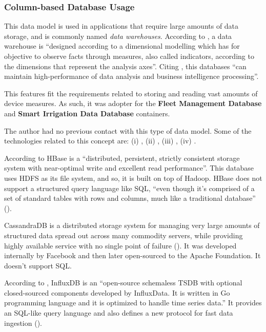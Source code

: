 \subsubsection{Column-based Database Usage}
\label{subsubsec:implementation:decisions:database:time}

This data model is used in applications that require large amounts of data storage, and is commonly named \textit{data warehouses}. According to \cite{dehdouh2015using}, a data warehouse  is ``designed according to a dimensional modelling which has for objective to observe facts through measures, also called indicators, according to the dimensions that represent the analysis axes''. Citing \cite{han2011survey}, this databases ``can maintain high-performance of data analysis and business intelligence processing''.

This features fit the requirements related to storing and reading vast amounts of device measures. As such, it was adopter for the \textbf{Fleet Management Database} and \textbf{Smart Irrigation Data Database} containers.

The author had no previous contact with this type of data model. Some of the technologies related to this concept are: (i) , (ii) , (iii) , (iv) .

According to \cite{george2011hbase} HBase is a ``distributed, persistent, strictly consistent storage system with near-optimal write and excellent read performance''. This database uses \gls{HDFS} as its file system, and so, it is built on top of Hadoop. 
HBase does not support a structured query language like \gls{SQL}, ``even though it's comprised of a set of standard tables with rows and columns, much like a traditional database'' (\cite{ibm-hbase}).

CassandraDB is a distributed storage system for managing very large amounts of structured data spread out across many commodity servers, while providing highly available service with no single point of failure (\cite{lakshman2010cassandra}).
It was developed internally by Facebook and then later open-sourced to the Apache Foundation. It doesn't support \gls{SQL}.

According to \cite{naqvi2017time}, InfluxDB is an ``open-source schemaless \gls{TSDB} with optional closed-sourced components developed by InfluxData. It is written in Go programming language and it is optimized to handle time series data.'' It provides an SQL-like query language and also defines a new protocol for fast data ingestion (\cite{ilp}).

